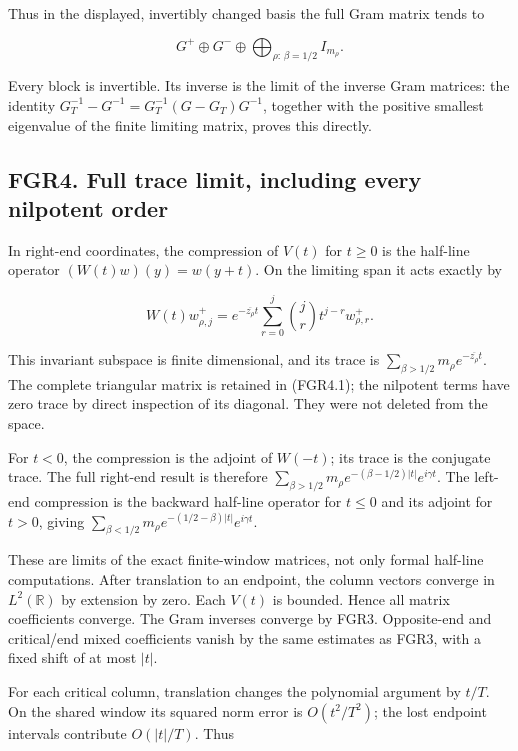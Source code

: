 Thus in the displayed, invertibly changed basis the full Gram matrix
tends to

\[
 G^+\oplus G^-\oplus\bigoplus_{\rho:\,\beta=1/2} I_{m_\rho}.
\tag{FGR3.4}
\]

Every block is invertible. Its inverse is the limit of the inverse Gram
matrices: the identity \(G_T^{-1}-G^{-1}=G_T^{-1}(G-G_T)G^{-1}\),
together with the positive smallest eigenvalue of the finite limiting
matrix, proves this directly.

\subsection{FGR4. Full trace limit, including every nilpotent
order}\label{fgr4.-full-trace-limit-including-every-nilpotent-order}

In right-end coordinates, the compression of \(V(t)\) for \(t\geq0\) is
the half-line operator \((W(t)w)(y)=w(y+t)\). On the limiting span it
acts exactly by

\[
 W(t)w^+_{\rho,j}
 =e^{-\overline{z_\rho}t}
   \sum_{r=0}^j\binom jr t^{j-r}w^+_{\rho,r}.
\tag{FGR4.1}
\]

This invariant subspace is finite dimensional, and its trace is
\(\sum_{\beta>1/2}m_\rho e^{-\overline{z_\rho}t}\). The complete
triangular matrix is retained in (FGR4.1); the nilpotent terms have zero
trace by direct inspection of its diagonal. They were not deleted from
the space.

For \(t<0\), the compression is the adjoint of \(W(-t)\); its trace is
the conjugate trace. The full right-end result is therefore
\(\sum_{\beta>1/2}m_\rho e^{-(\beta-1/2)|t|}e^{i\gamma t}\). The
left-end compression is the backward half-line operator for \(t\leq0\)
and its adjoint for \(t>0\), giving
\(\sum_{\beta<1/2}m_\rho e^{-(1/2-\beta)|t|}e^{i\gamma t}\).

These are limits of the exact finite-window matrices, not only formal
half-line computations. After translation to an endpoint, the column
vectors converge in \(L^2(\mathbb R)\) by extension by zero. Each
\(V(t)\) is bounded. Hence all matrix coefficients converge. The Gram
inverses converge by FGR3. Opposite-end and critical/end mixed
coefficients vanish by the same estimates as FGR3, with a fixed shift of
at most \(|t|\).

For each critical column, translation changes the polynomial argument by
\(t/T\). On the shared window its squared norm error is \(O(t^2/T^2)\);
the lost endpoint intervals contribute \(O(|t|/T)\). Thus

